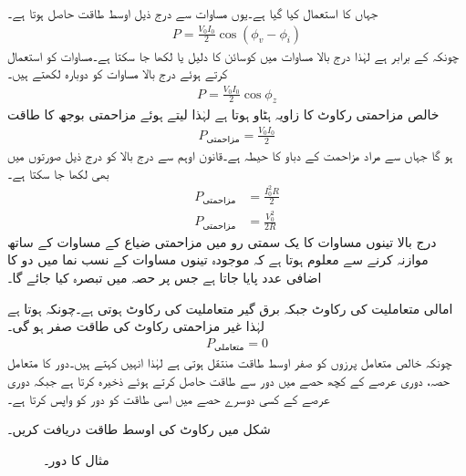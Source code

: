 جہاں  کا استعمال کیا گیا ہے۔یوں مساوات  سے درج ذیل اوسط طاقت حاصل  ہوتا ہے۔
\begin{align}\label{مساوات_طاقت_عمومی_الف}
P=\frac{V_0 I_0}{2}\cos(\phi_v-\phi_i)
\end{align}
چونکہ  کے برابر ہے لہٰذا درج بالا مساوات میں کوسائن کا دلیل  یا  لکھا جا سکتا ہے۔مساوات  کو استعمال کرتے ہوئے درج بالا مساوات کو دوبارہ لکھتے ہیں۔
\begin{align}\label{مساوات_طاقت_عمومی_ب}
P=\frac{V_0 I_0}{2}\cos \phi_z
\end{align}
خالص مزاحمتی رکاوٹ  کا زاویہ ہٹاو  ہوتا ہے لہٰذا  لیتے ہوئے مزاحمتی بوجھ کا طاقت
\begin{align}\label{مساوات_طاقت_مزاحمتی_طاقت_الف}
P_{\text{مزاحمتی}}=\frac{V_0 I_0}{2}
\end{align}
ہو گا جہاں  سے مراد مزاحمت کے دباو کا حیطہ ہے۔قانون اوہم سے درج بالا کو درج ذیل صورتوں میں بھی لکھا جا سکتا ہے۔
\begin{align}
P_{\text{مزاحمتی}}&=\frac{I^2_0 R}{2} \label{مساوات_طاقت_مزاحمتی_طاقت_ب}\\
P_{\text{مزاحمتی}}&=\frac{V^2_0}{2 R} \label{مساوات_طاقت_مزاحمتی_طاقت_پ}
\end{align}
درج بالا تینوں مساوات کا یک سمتی رو میں مزاحمتی ضیاع کے مساوات کے ساتھ موازنہ کرنے سے معلوم ہوتا ہے کہ موجودہ تینوں مساوات کے نسب نما میں دو  کا اضافی عدد پایا جاتا ہے جس پر حصہ  میں  تبصرہ کیا جائے گا۔

امالی متعاملیت کی رکاوٹ  جبکہ برق گیر متعاملیت کی رکاوٹ  ہوتی ہے۔چونکہ  ہوتا ہے لہٰذا غیر مزاحمتی رکاوٹ کی طاقت صفر ہو گی۔
\begin{align}
P_{\text{متعاملی}} =0
\end{align}
چونکہ خالص متعامل پرزوں کو صفر اوسط طاقت منتقل ہوتی ہے لہٰذا انہیں  کہتے ہیں۔دور کا متعامل حصہ، دوری عرصے کے کچھ حصے میں  دور سے طاقت حاصل کرتے ہوئے  ذخیرہ کرتا ہے  جبکہ دوری عرصے کے کسی دوسرے حصے میں اسی طاقت کو دور کو واپس کرتا ہے۔

شکل  میں رکاوٹ کی اوسط طاقت دریافت کریں۔
\begin{figure}
\centering
{}
\caption{مثال  کا دور۔}
\label{مشق_طاقت_مزاحمت_امالہ_الف}
\end{figure}


